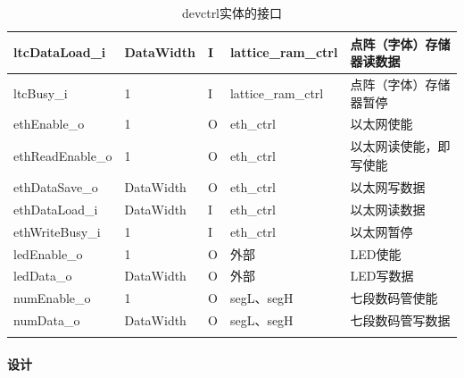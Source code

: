 \documentclass{article}
\begin{document}
\begin{spacing}{1.4}
\begin{longtable}{l|l|l|l|p{5cm}}
\hline ltcDataLoad\_i          & DataWidth              & I     & lattice\_ram\_ctrl& 点阵（字体）存储器读数据 \\
\hline ltcBusy\_i              & 1                      & I     & lattice\_ram\_ctrl& 点阵（字体）存储器暂停 \\
\hline ethEnable\_o            & 1                      & O     & eth\_ctrl         & 以太网使能 \\
\hline ethReadEnable\_o        & 1                      & O     & eth\_ctrl         & 以太网读使能，即$\overline{\text{写使能}}$ \\
\hline ethDataSave\_o          & DataWidth              & O     & eth\_ctrl         & 以太网写数据 \\
\hline ethDataLoad\_i          & DataWidth              & I     & eth\_ctrl         & 以太网读数据 \\
\hline ethWriteBusy\_i         & 1                      & I     & eth\_ctrl         & 以太网暂停 \\
\hline ledEnable\_o            & 1                      & O     & 外部              & LED使能 \\
\hline ledData\_o              & DataWidth              & O     & 外部              & LED写数据 \\
\hline numEnable\_o            & 1                      & O     & segL、segH        & 七段数码管使能 \\
\hline numData\_o              & DataWidth              & O     & segL、segH        & 七段数码管写数据 \\
\hline
\caption{devctrl实体的接口}
\label{tb:devctrl-interface}
\end{longtable}

\paragraph{设计}\mbox{}


\end{spacing}
\end{document}
